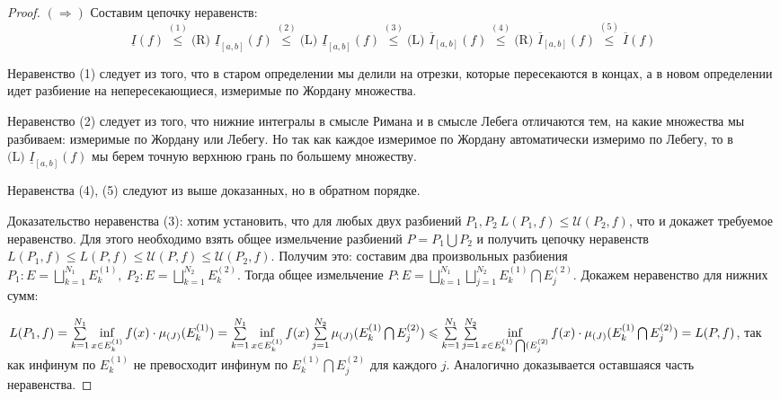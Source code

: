 \begin{proof}
$(\Rightarrow)$	Составим цепочку неравенств:
\begin{equation}
\underline{I}(f) \overset{(1)}{\leqslant} \text{(R) }\underline{I}_{[a,b]}(f)\overset{(2)}{\leqslant} \text{(L) }\underline{I}_{[a,b]}(f)\overset{(3)}{\leqslant}\text{(L) } \overline{I}_{[a,b]}(f) \overset{(4)}{\leqslant} \text{(R) } \overline{I}_{[a,b]}(f)\overset{(5)}{\leqslant} \overline{I}(f)\tag{10.1.1}\label{10.1.1} 
\end{equation}

Неравенство (1) следует из того, что в старом определении мы делили на отрезки, которые пересекаются в концах, а в новом определении идет разбиение на непересекающиеся, измеримые по Жордану множества.

Неравенство (2) следует из того, что нижние интегралы в смысле Римана и в смысле Лебега отличаются тем, на какие множества мы разбиваем: измеримые по Жордану или Лебегу. Но так как каждое измеримое по Жордану автоматически измеримо по Лебегу, то в $\text{(L) }\underline{I}_{[a,b]}(f)$ мы берем точную верхнюю грань по большему множеству.

Неравенства (4), (5) следуют из выше доказанных, но в обратном порядке.

Доказательство неравенства (3): хотим установить, что для любых двух разбиений $P_1, P_2\ L(P_1, f) \leqslant \mathcal{U}(P_2, f)$, что и докажет требуемое неравенство. Для этого необходимо взять общее измельчение разбиений $P=P_1 \bigcup P_2$ и получить цепочку неравенств $L(P_1, f) \leqslant L(P, f) \leqslant \mathcal{U}(P, f) \leqslant \mathcal{U}(P_2, f)$. Получим это: составим два произвольных разбиения 
$P_1 : E = \bigsqcup\limits_{k=1}^{N_1} E_k^{(1)},\ P_2 : E = \bigsqcup\limits_{k=1}^{N_2} E_k^{(2)}$. Тогда общее измельчение $ P : E = \bigsqcup\limits_{k=1}^{N_1} \bigsqcup\limits_{j=1}^{N_2} E_k^{(1)} \bigcap E_j^{(2)}$.
Докажем неравенство для нижних сумм:

 $L(P_1, f)=\sum\limits_{k=1}^{N_1} \inf\limits_{x\in E_k^{(1)}}f(x) \cdot \mu_{(J)}(E_k^{(1)}) =
\sum\limits_{k=1}^{N_1} \inf\limits_{x\in E_k^{(1)}}f(x) \sum\limits_{j=1}^{N_2} \mu_{(J)} (E_k^{(1)}\bigcap E_j^{(2)})\?\leqslant \sum\limits_{k=1}^{N_1}\sum\limits_{j=1}^{N_2}\inf\limits_{x\in E_k^{(1)}\bigcap (E_j^{(2)}}f(x)\cdot \mu_{(J)} (E_k^{(1)}\bigcap E_j^{(2)})=L(P,f)$, так как инфинум по $E_k^{(1)}$ не превосходит инфинум по $E_k^{(1)}\bigcap E_j^{(2)}$ для каждого $j$. Аналогично доказывается оставшаяся часть неравенства.


\end{proof}
